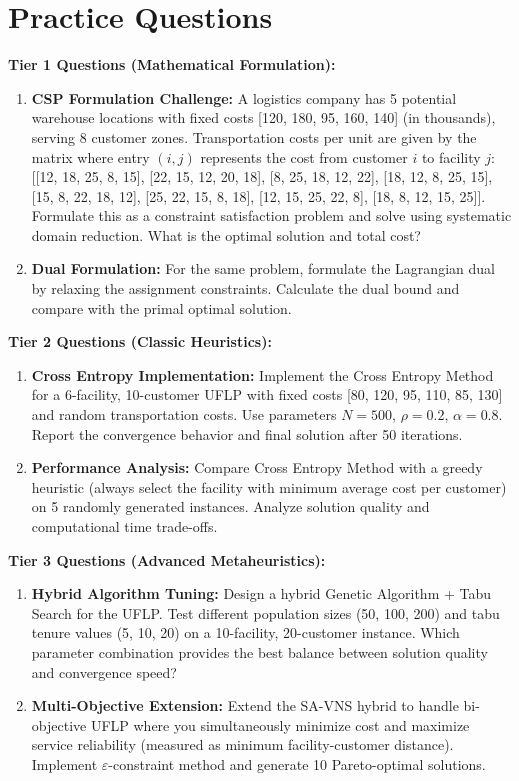 \documentclass{article}
\begin{document}
\section{Practice Questions}

\textbf{Tier 1 Questions (Mathematical Formulation):}

\begin{enumerate}
\item \textbf{CSP Formulation Challenge:} A logistics company has 5 potential warehouse locations with fixed costs [120, 180, 95, 160, 140] (in thousands), serving 8 customer zones. Transportation costs per unit are given by the matrix where entry $(i,j)$ represents the cost from customer $i$ to facility $j$: [[12, 18, 25, 8, 15], [22, 15, 12, 20, 18], [8, 25, 18, 12, 22], [18, 12, 8, 25, 15], [15, 8, 22, 18, 12], [25, 22, 15, 8, 18], [12, 15, 25, 22, 8], [18, 8, 12, 15, 25]]. Formulate this as a constraint satisfaction problem and solve using systematic domain reduction. What is the optimal solution and total cost?

\item \textbf{Dual Formulation:} For the same problem, formulate the Lagrangian dual by relaxing the assignment constraints. Calculate the dual bound and compare with the primal optimal solution.
\end{enumerate}

\textbf{Tier 2 Questions (Classic Heuristics):}

\begin{enumerate}
\item \textbf{Cross Entropy Implementation:} Implement the Cross Entropy Method for a 6-facility, 10-customer UFLP with fixed costs [80, 120, 95, 110, 85, 130] and random transportation costs. Use parameters $N=500$, $\rho=0.2$, $\alpha=0.8$. Report the convergence behavior and final solution after 50 iterations.

\item \textbf{Performance Analysis:} Compare Cross Entropy Method with a greedy heuristic (always select the facility with minimum average cost per customer) on 5 randomly generated instances. Analyze solution quality and computational time trade-offs.
\end{enumerate}

\textbf{Tier 3 Questions (Advanced Metaheuristics):}

\begin{enumerate}
\item \textbf{Hybrid Algorithm Tuning:} Design a hybrid Genetic Algorithm + Tabu Search for the UFLP. Test different population sizes (50, 100, 200) and tabu tenure values (5, 10, 20) on a 10-facility, 20-customer instance. Which parameter combination provides the best balance between solution quality and convergence speed?

\item \textbf{Multi-Objective Extension:} Extend the SA-VNS hybrid to handle bi-objective UFLP where you simultaneously minimize cost and maximize service reliability (measured as minimum facility-customer distance). Implement $\varepsilon$-constraint method and generate 10 Pareto-optimal solutions.
\end{enumerate}
\end{document}
